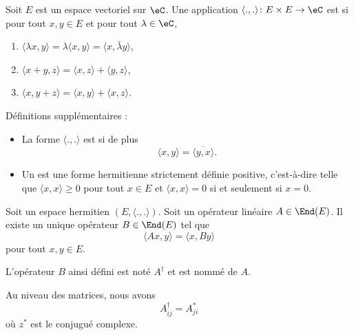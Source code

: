 \begin{definition}  \label{DefMZQxmQ}
	Soit \( E\) est un espace vectoriel sur \( \eC\). Une application \( \langle ., .\rangle \colon E\times E\to \eC\) est  si pour tout \( x,y\in E\) et pour tout \( \lambda\in \eC\),
	\begin{enumerate}
		\item
		      \( \langle \lambda x, y\rangle =\lambda\langle x,y \rangle =\langle x, \bar\lambda y\rangle \),
		\item
		      \( \langle x+y, z\rangle =\langle x, z\rangle+\langle y, z\rangle  \),
		\item
		      \( \langle x, y+z\rangle =\langle x, y\rangle +\langle x, z\rangle \).
	\end{enumerate}
	Définitions supplémentaires :
	\begin{itemize}
		\item
		      La forme \( \langle ., .\rangle \) est  si de plus
		      \begin{equation}
			      \langle x, y\rangle =\overline{ \langle y, x\rangle  }.
		      \end{equation}
		\item
		      Un  est une forme hermitienne strictement définie positive, c'est-à-dire telle que \( \langle x, x\rangle \geq 0\) pour tout \( x\in E\) et \( \langle x, x\rangle =0\) si et seulement si \( x=0\).
	\end{itemize}
\end{definition}

\begin{propositionDef}     \label{PROPooRPRRooRYEMCB}
	Soit un espace hermitien \( (E,\langle ., .\rangle )\). Soit un opérateur linéaire \( A\in\End(E)\). Il existe un unique opérateur \( B\in\End(E)\) tel que
	\begin{equation}
		\langle Ax, y\rangle =\langle x, By\rangle
	\end{equation}
	pour tout \( x,y\in E\).

	L'opérateur \( B\) ainsi défini est noté \( A^{\dag}\) et est nommé  de \( A\).
\end{propositionDef}

\begin{lemma}       \label{LEMooBOXMooSDyCfm}
	Au niveau des matrices, nous avons
	\begin{equation}
		A^{\dag}_{ij}=A^*_{ji}
	\end{equation}
	où \( z^*\) est le conjugué complexe.
\end{lemma}

